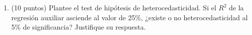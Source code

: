 \documentclass[10pt,a4paper]{article}
\begin{document}
\begin{enumerate}
\begin{enumerate}

\item (10 puntos) Plantee el test de hipótesis de heterocedasticidad. Si el $R^2$ de la regresión auxiliar asciende al valor de 25\%, ¿existe o no heterocedasticidad al 5\% de significancia? Justifique su respuesta.\\

\end{enumerate}
\end{enumerate}
\end{document}
